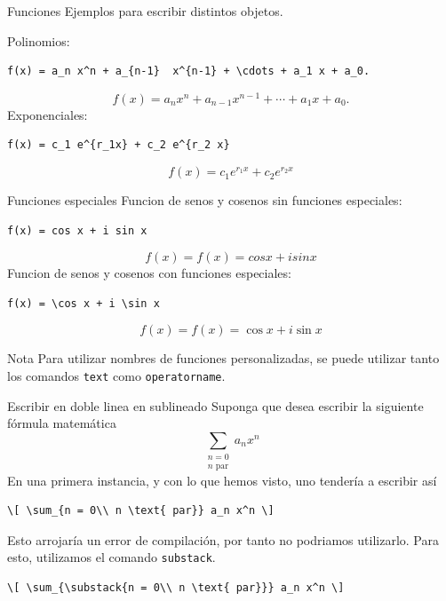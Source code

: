 \documentclass[../slides.tex]{subfiles}
\begin{document}
    \begin{frame}[fragile]{Funciones}
        Ejemplos para escribir distintos objetos.
        
        Polinomios:
            \begin{verbatim}
f(x) = a_n x^n + a_{n-1}  x^{n-1} + \cdots + a_1 x + a_0.
            \end{verbatim}
\[f(x) = a_n x^n + a_{n-1}  x^{n-1} + \cdots + a_1 x + a_0.
\]
        Exponenciales:
            \begin{verbatim}
f(x) = c_1 e^{r_1x} + c_2 e^{r_2 x}
            \end{verbatim}
\[f(x) = c_1 e^{r_1x} + c_2 e^{r_2 x}
\]
    \end{frame} 
    
    \begin{frame}[fragile]{Funciones especiales}
        Funcion de senos y cosenos sin funciones especiales:
            \begin{verbatim}
f(x) = cos x + i sin x
            \end{verbatim}
\[f(x) = f(x) = cos x + i sin x
\]
    Funcion de senos y cosenos con funciones especiales:
            \begin{verbatim}
f(x) = \cos x + i \sin x
            \end{verbatim}
\[f(x) = f(x) = \cos x + i \sin x
\]
        \begin{block}{Nota}
        	Para utilizar nombres de funciones personalizadas, se puede utilizar tanto los comandos \texttt{text} como \texttt{operatorname}.
        \end{block}
    \end{frame} 
    
    \begin{frame}[fragile]{Escribir en doble linea en sublineado}
        Suponga que desea escribir la siguiente fórmula matemática
            \[ \sum_{\substack{n = 0\\ n \text{ par}}} a_n x^n \]
            \pause
        En una primera instancia, y con lo que hemos visto, uno tendería a escribir así
            \begin{verbatim}
\[ \sum_{n = 0\\ n \text{ par}} a_n x^n \]
            \end{verbatim}
        \pause
        Esto arrojaría un error de compilación, por tanto no podriamos utilizarlo. \pause Para esto, utilizamos el comando \texttt{substack}.
            \begin{verbatim}
\[ \sum_{\substack{n = 0\\ n \text{ par}}} a_n x^n \]
            \end{verbatim}
    \end{frame} 
    
\end{document}

